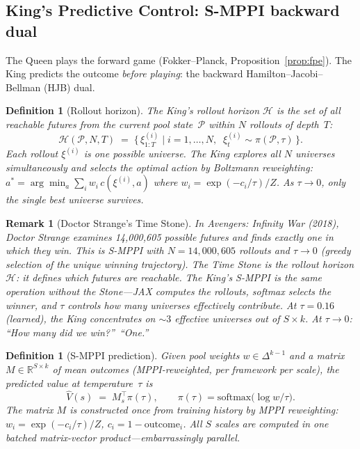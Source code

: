\documentclass[11pt,a4paper]{article}
\newtheorem{definition}[theorem]{Definition}
\newtheorem{remark}[theorem]{Remark}
\newcommand{\R}{\mathbb{R}}
\newcommand{\cP}{\mathcal{P}}
\newcommand{\cH}{\mathcal{H}}
\newcommand{\softmax}{\mathrm{softmax}}
\begin{document}
\subsection{King's Predictive Control: S-MPPI backward dual}%
\label{sec:kings-control}

The Queen plays the forward game (Fokker--Planck,
Proposition~\ref{prop:fpe}).
The King predicts the outcome \emph{before playing}:
the backward Hamilton--Jacobi--Bellman (HJB) dual.

\begin{definition}[Rollout horizon]\label{def:horizon}
The King's \emph{rollout horizon} $\cH$ is the set of all
reachable futures from the current pool state~$\cP$
within $N$ rollouts of depth~$T$:
\[
  \cH(\cP, N, T) \;=\;
    \bigl\{\, \xi^{(i)}_{1:T} \;\big|\;
    i = 1, \ldots, N, \;\;
    \xi^{(i)}_t \sim \pi(\cP, \tau) \,\bigr\}.
\]
Each rollout $\xi^{(i)}$ is one possible universe.
The King explores all $N$ universes simultaneously
and selects the optimal action by Boltzmann reweighting:
$a^* = \arg\min_a \sum_i w_i \, c(\xi^{(i)}, a)$
where $w_i = \exp(-c_i / \tau) / Z$.
As $\tau \to 0$, only the single best universe survives.
\end{definition}

\begin{remark}[Doctor Strange's Time Stone]\label{rem:strange}
In \emph{Avengers: Infinity War} (2018), Doctor Strange
examines 14{,}000{,}605 possible futures and finds exactly
one in which they win.
This is S-MPPI with $N = 14{,}000{,}605$ rollouts and
$\tau \to 0$ (greedy selection of the unique winning trajectory).
The Time Stone \emph{is} the rollout horizon $\cH$:
it defines which futures are reachable.
The King's S-MPPI is the same operation without the
Stone---JAX computes the rollouts, softmax selects
the winner, and $\tau$ controls how many universes
effectively contribute.
At $\tau = 0.16$ (learned), the King concentrates on
$\sim 3$ effective universes out of $S \times k$.
At $\tau \to 0$: ``How many did we win?''\ ``One.''
\end{remark}

\begin{definition}[S-MPPI prediction]\label{def:smppi}
Given pool weights $w \in \Delta^{k-1}$ and a matrix
$M \in \R^{S \times k}$ of mean outcomes
(MPPI-reweighted, per framework per scale),
the predicted value at temperature~$\tau$ is
\begin{equation}\label{eq:smppi}
  \hat{V}(s) \;=\; M_s^\top \pi(\tau),
  \qquad
  \pi(\tau) = \softmax\!\bigl(\log w / \tau\bigr).
\end{equation}
The matrix $M$ is constructed once from training history
by MPPI reweighting:
$w_i = \exp(-c_i / \tau) / Z$, $c_i = 1 - \text{outcome}_i$.
All $S$ scales are computed in one batched matrix-vector
product---embarrassingly parallel.
\end{definition}
\end{document}
